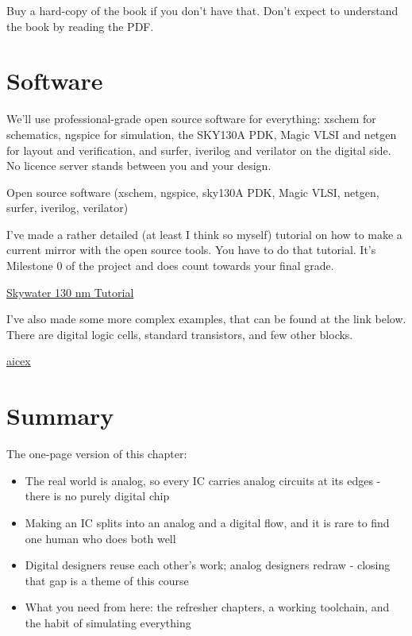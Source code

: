 Buy a hard-copy of the book if you don't have that. Don't expect to
understand the book by reading the PDF.

\section{Software}\label{software}

We'll use professional-grade open source software for everything: xschem
for schematics, ngspice for simulation, the SKY130A PDK, Magic VLSI and
netgen for layout and verification, and surfer, iverilog and verilator
on the digital side. No licence server stands between you and your
design.

Open source software (xschem, ngspice, sky130A PDK, Magic VLSI, netgen,
surfer, iverilog, verilator)

I've made a rather detailed (at least I think so myself) tutorial on how
to make a current mirror with the open source tools. You have to do that
tutorial. It's Milestone 0 of the project and does count towards your
final grade.

\href{https://analogicus.com/aic2026/sky130nm_tutorial}{Skywater 130 nm
Tutorial}

I've also made some more complex examples, that can be found at the link
below. There are digital logic cells, standard transistors, and few
other blocks.

\href{https://wulffern.github.io/aicex}{aicex}

\section{Summary}\label{summary}

The one-page version of this chapter:

\begin{itemize}
\tightlist
\item
  The real world is analog, so every IC carries analog circuits at its
  edges - there is no purely digital chip
\item
  Making an IC splits into an analog and a digital flow, and it is rare
  to find one human who does both well
\item
  Digital designers reuse each other's work; analog designers redraw -
  closing that gap is a theme of this course
\item
  What you need from here: the refresher chapters, a working toolchain,
  and the habit of simulating everything
\end{itemize}

\label{refs}
\begin{CSLReferences}{0}{0}
\CSLLeftMargin{{[}1{]} }%

\end{CSLReferences}

